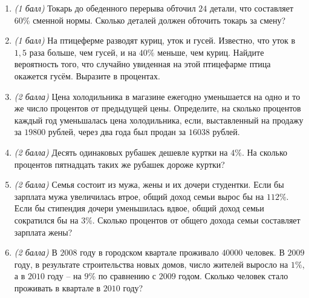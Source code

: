 \documentclass[12pt, a4paper]{article}
\begin{document}
	
	
	\begin{enumerate}
		\item \textit{(1 балл)} Токарь до обеденного перерыва обточил $24$ детали, что составляет $60\%$ сменной нормы. Сколько деталей должен обточить токарь за смену?
		\item \textit{(1 балл)} На птицеферме разводят куриц, уток и гусей. Известно, что уток в $1,5$ раза больше, чем гусей, и на $40\%$ меньше, чем куриц. Найдите вероятность того, что случайно увиденная на этой птицефарме птица окажется гусём. Выразите в процентах.
		\item \textit{(2 балла)} Цена холодильника в магазине ежегодно уменьшается на одно и то же число процентов от предыдущей цены. Определите, на сколько процентов каждый год уменьшалась цена холодильника, если, выставленный на продажу за $19 800$ рублей, через два года был продан за $16 038$ рублей.
		\item \textit{(2 балла)} Десять одинаковых рубашек дешевле куртки на $4\%$. На сколько процентов пятнадцать таких же рубашек дороже куртки?
		\item \textit{(2 балла)} Семья состоит из мужа, жены и их дочери студентки. Если бы зарплата мужа увеличилась втрое, общий доход семьи вырос бы на $112\%$. Если бы стипендия дочери уменьшилась вдвое, общий доход семьи сократился бы на $3\%$. Сколько процентов от общего дохода семьи составляет зарплата жены?
		\item \textit{(2 балла)} В $2008$ году в городском квартале проживало $40000$ человек. В $2009$ году, в результате строительства новых домов, число жителей выросло на $1\%$, а в $2010$ году – на $9\%$ по сравнению с $2009$ годом. Сколько человек стало проживать в квартале в $2010$ году?
		
	\end{enumerate}
\end{document}
